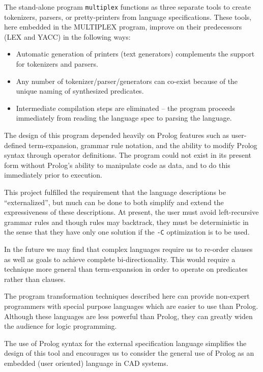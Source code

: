 The stand-alone program {\tt multiplex} functions
as three separate tools to create tokenizers,
parsers, or pretty-printers from language specifications.
These tools, here embedded in the MULTIPLEX program, improve
on their predecessors (LEX and YACC) in the following ways:
\begin{itemize}
\item{}
Automatic generation of printers (text generators) complements
the support for tokenizers and parsers.
\item{}
Any number of tokenizer/parser/generators can co-exist
because of the unique naming of synthesized predicates.
\item{}
Intermediate compilation steps are eliminated -- the program proceeds
immediately from reading the language spec to parsing the language.
\end{itemize}

The design of this program depended heavily on
Prolog features such as user-defined term-expansion,
grammar rule notation, and the ability to modify
Prolog syntax through operator definitions.
The program could not exist in its present
form without Prolog's ability to manipulate code as data,
and to do this immediately prior to execution.

This project fulfilled the requirement that the
language descriptions be ``externalized'',
but much can be done to both simplify and extend
the expressiveness of these descriptions.
At present, the user must avoid left-recursive grammar
rules and though
rules may backtrack, they must be deterministic
in the sense that they have only one solution if the
{\tt -C} optimization is to be used.

In the future we may find that complex languages
require us to re-order clauses as well as goals
to achieve complete bi-directionality. This would
require a technique more general than term-expansion
in order to operate on predicates rather than clauses.

The program transformation techniques described here can
provide non-expert programmers with special purpose
languages which are easier to use than Prolog.
Although these languages are less powerful than Prolog,
they can greatly widen the audience for logic programming.

The use of Prolog syntax for the external specification
language simplifies the design of this tool and
encourages us to consider the general use of Prolog as
an embedded (user oriented) language in CAD systems.


